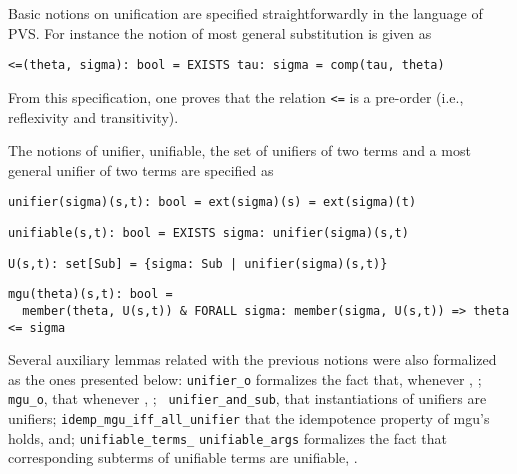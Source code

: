 \documentclass[submission,copyright,creativecommons]{eptcs}
\begin{document}
Basic notions on unification are specified straightforwardly in the
language of PVS.  For instance the notion of most general substitution
is given as

{\small
\begin{verbatim}
<=(theta, sigma): bool = EXISTS tau: sigma = comp(tau, theta)
\end{verbatim}
}

From this specification, one proves that the relation {\tt <=} is a
pre-order (i.e., reflexivity and transitivity).

The notions of unifier, unifiable, the set of unifiers of two terms
and a most general unifier of two terms are specified as

{\small
\begin{verbatim}
unifier(sigma)(s,t): bool = ext(sigma)(s) = ext(sigma)(t)
\end{verbatim}
} {\small
\begin{verbatim}
unifiable(s,t): bool = EXISTS sigma: unifier(sigma)(s,t)
\end{verbatim}
} {\small
\begin{verbatim}
U(s,t): set[Sub] = {sigma: Sub | unifier(sigma)(s,t)}
\end{verbatim}
} {\small
\begin{verbatim}
mgu(theta)(s,t): bool = 
  member(theta, U(s,t)) & FORALL sigma: member(sigma, U(s,t)) => theta <= sigma
\end{verbatim}}

  Several auxiliary lemmas related with the previous notions were also
  formalized as the ones presented below: {\tt unifier\_o} formalizes
  the fact that, whenever ,
  ; {\tt mgu\_o}, that whenever , ; {\tt
    unifier\_and\_sub}, that instantiations of unifiers are unifiers;
  {\tt idemp\_mgu\_iff\_all\_unifier} that the idempotence property of
  mgu's holds, and; {\tt unifiable\_terms\_} {\tt unifiable\_args} formalizes the fact that corresponding
  subterms of unifiable terms are unifiable, .
\end{document}
